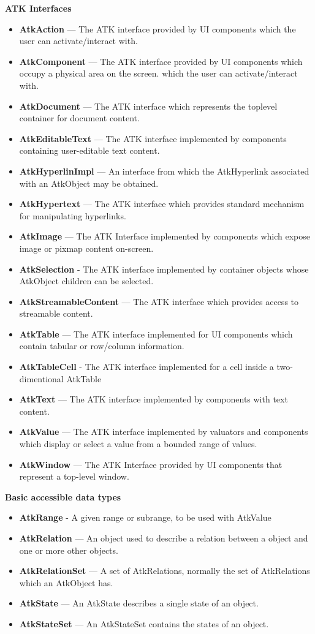 \documentclass[12pt]{article}
\begin{document}
\begin{itemize}
\textbf{ATK Interfaces}
\begin{itemize}
\item \textbf{AtkAction} — The ATK interface provided by UI components which the user can activate/interact with.
\item \textbf{AtkComponent} — The ATK interface provided by UI components which occupy a physical area on the screen. which the user can activate/interact with.
\item \textbf{AtkDocument} — The ATK interface which represents the toplevel container for document content.
\item \textbf{AtkEditableText} — The ATK interface implemented by components containing user-editable text content.
\item \textbf{AtkHyperlinImpl} — An interface from which the AtkHyperlink associated with an AtkObject may be obtained.
\item \textbf{AtkHypertext} — The ATK interface which provides standard mechanism for manipulating hyperlinks.
\item \textbf{AtkImage} — The ATK Interface implemented by components which expose image or pixmap content on-screen.
\item \textbf{AtkSelection} - The ATK interface implemented by container objects whose AtkObject children can be selected.
\item \textbf{AtkStreamableContent} — The ATK interface which provides access to streamable content.
\item \textbf{AtkTable} — The ATK interface implemented for UI components which contain tabular or row/column information.
\item \textbf{AtkTableCell} - The ATK interface implemented for a cell inside a two-dimentional AtkTable
\item \textbf{AtkText} — The ATK interface implemented by components with text content.
\item \textbf{AtkValue} — The ATK interface implemented by valuators and components which display or select a value from a bounded range of values.
\item \textbf{AtkWindow} — The ATK Interface provided by UI components that represent a top-level window.

\end{itemize}


\textbf{Basic accessible data types}
\begin{itemize}

\item \textbf{AtkRange} - A given range or subrange, to be used with AtkValue
\item \textbf{AtkRelation} — An object used to describe a relation between a object and one or more other objects.
\item \textbf{AtkRelationSet} — A set of AtkRelations, normally the set of AtkRelations which an AtkObject has.
\item \textbf{AtkState} — An AtkState describes a single state of an object.
\item \textbf{AtkStateSet} — An AtkStateSet contains the states of an object.


\end{itemize}
\end{itemize}
\end{document}

